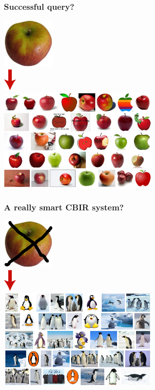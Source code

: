 \documentclass[10pt]{beamer}
\begin{document}
\begin{frame}
  \frametitle{Successful query?}
  \begin{center}
    \includegraphics[width=0.2\textwidth]{FIGURES/anapple}\\
    \includegraphics[width=0.05\textwidth]{FIGURES/redarrow}\\
    \includegraphics[width=0.6\textwidth]{FIGURES/applequery}\\
  \end{center}
\end{frame}


\begin{frame}
  \frametitle{A really smart CBIR system?}
  \begin{center}
    \includegraphics[width=0.2\textwidth]{FIGURES/noapple}\\
    \includegraphics[width=0.05\textwidth]{FIGURES/redarrow}\\
    \includegraphics[width=0.6\textwidth]{FIGURES/Penguins}\\
  \end{center}
\end{frame}
\end{document}
